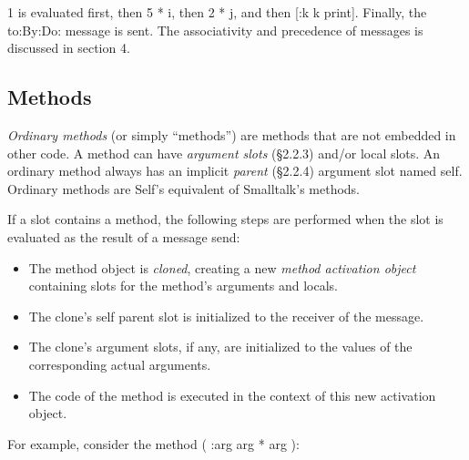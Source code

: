 \documentclass[letterpaper,10pt,english]{sphinxmanual}
\begin{document}
1 is evaluated first, then 5 * i, then 2 * j, and then {[}\textbar{}:k \textbar{} k print{]}. Finally, the to:By:Do:
message is sent. The associativity and precedence of messages is discussed in section 4.


\subsection{Methods}
\label{langref:methods}\label{langref:index-19}
\emph{Ordinary methods} (or simply “methods”) are methods that are not embedded in other code. A
method can have \emph{argument slots} (\S{}2.2.3) and/or local slots. An ordinary method always has an implicit
\emph{parent} (\S{}2.2.4) argument slot named self. Ordinary methods are Self’s equivalent of
Smalltalk’s methods.

If a slot contains a method, the following steps are performed when the slot is evaluated as the result
of a message send:
\begin{itemize}
\item {} 
The method object is \emph{cloned}, creating a new \emph{method activation object} containing slots for the method’s arguments and locals.

\item {} 
The clone’s self parent slot is initialized to the receiver of the message.

\item {} 
The clone’s argument slots, if any, are initialized to the values of the corresponding actual arguments.

\item {} 
The code of the method is executed in the context of this new activation object.

\end{itemize}

For example, consider the method ( \textbar{} :arg \textbar{} arg * arg ):
\begin{figure}[htbp]\begin{flushleft}

\end{flushleft}\end{figure}
\end{document}
